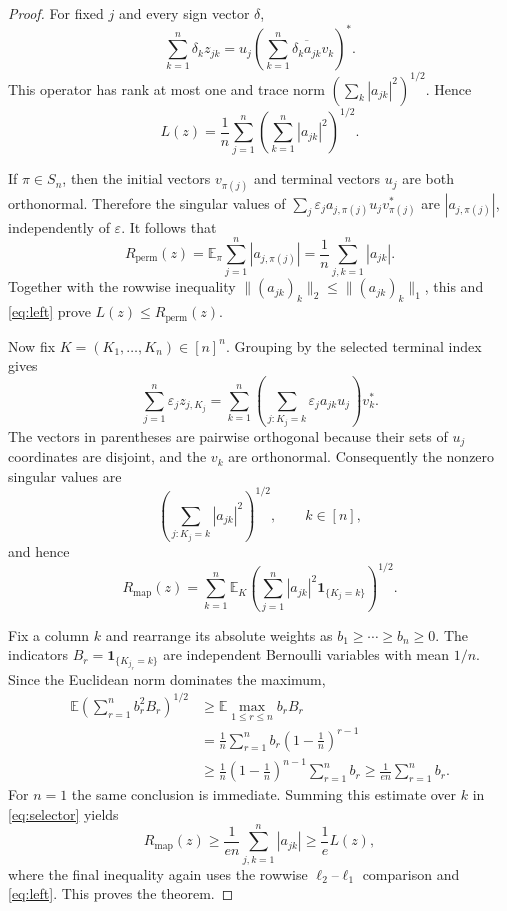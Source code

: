 \documentclass[11pt]{article}
\newcommand{\E}{\mathbb E}
\begin{document}
\begin{proof}
For fixed $j$ and every sign vector $\delta$,
\[
 \sum_{k=1}^n\delta_kz_{jk}
 =u_j\left(\sum_{k=1}^n\overline{\delta_ka_{jk}}v_k\right)^*.
\]
This operator has rank at most one and trace norm $(\sum_k|a_{jk}|^2)^{1/2}$.  Hence
\begin{equation}\label{eq:left}
 L(z)=\frac1n\sum_{j=1}^n\left(\sum_{k=1}^n|a_{jk}|^2\right)^{1/2}.
\end{equation}

If $\pi\in S_n$, then the initial vectors $v_{\pi(j)}$ and terminal vectors $u_j$ are both orthonormal.  Therefore the singular values of $\sum_j\varepsilon_ja_{j,\pi(j)}u_jv_{\pi(j)}^*$ are $|a_{j,\pi(j)}|$, independently of $\varepsilon$.  It follows that
\[
 R_{\mathrm{perm}}(z)
 =\E_{\pi}\sum_{j=1}^n|a_{j,\pi(j)}|
 =\frac1n\sum_{j,k=1}^n|a_{jk}|.
\]
Together with the rowwise inequality $\|(a_{jk})_k\|_2\le\|(a_{jk})_k\|_1$, this and \eqref{eq:left} prove $L(z)\le R_{\mathrm{perm}}(z)$.

Now fix $K=(K_1,\ldots,K_n)\in[n]^n$.  Grouping by the selected terminal index gives
\[
 \sum_{j=1}^n\varepsilon_jz_{j,K_j}
 =\sum_{k=1}^n\left(\sum_{j:K_j=k}\varepsilon_ja_{jk}u_j\right)v_k^*.
\]
The vectors in parentheses are pairwise orthogonal because their sets of $u_j$ coordinates are disjoint, and the $v_k$ are orthonormal.  Consequently the nonzero singular values are
\[
 \left(\sum_{j:K_j=k}|a_{jk}|^2\right)^{1/2},\qquad k\in[n],
\]
and hence
\begin{equation}\label{eq:selector}
 R_{\mathrm{map}}(z)=\sum_{k=1}^n\E_K
 \left(\sum_{j=1}^n|a_{jk}|^2\mathbf1_{\{K_j=k\}}\right)^{1/2}.
\end{equation}

Fix a column $k$ and rearrange its absolute weights as $b_1\ge\cdots\ge b_n\ge0$.  The indicators $B_r=\mathbf1_{\{K_{j_r}=k\}}$ are independent Bernoulli variables with mean $1/n$.  Since the Euclidean norm dominates the maximum,
\begin{align*}
 \E\left(\sum_{r=1}^n b_r^2B_r\right)^{1/2}
 &\ge \E\max_{1\le r\le n}b_rB_r\\
 &=\frac1n\sum_{r=1}^n b_r\left(1-\frac1n\right)^{r-1}\\
 &\ge \frac1n\left(1-\frac1n\right)^{n-1}\sum_{r=1}^n b_r
 \ge \frac1{en}\sum_{r=1}^n b_r.
\end{align*}
For $n=1$ the same conclusion is immediate.  Summing this estimate over $k$ in \eqref{eq:selector} yields
\[
 R_{\mathrm{map}}(z)\ge\frac1{en}\sum_{j,k=1}^n|a_{jk}|
 \ge\frac1e L(z),
\]
where the final inequality again uses the rowwise $\ell_2$--$\ell_1$ comparison and \eqref{eq:left}.  This proves the theorem.
\end{proof}
\end{document}
